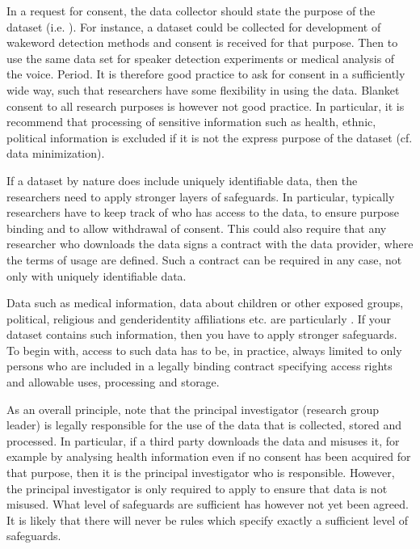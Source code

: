 \documentclass[letterpaper,10pt,english]{jupyterBook}
\begin{document}
\sphinxAtStartPar
In a request for consent, the data collector should state the purpose of
the dataset (i.e. ). For instance, a dataset could be
collected for development of wake\sphinxhyphen{}word detection methods and consent is
received for that purpose. Then  to use the same
data set for speaker detection experiments or medical analysis of the
voice. Period. It is therefore good practice to ask for consent in a
sufficiently wide way, such that researchers have some flexibility in
using the data. Blanket consent to all research purposes is however not
good practice. In particular, it is recommend that processing of
sensitive information such as health, ethnic, political information is
excluded if it is not the express purpose of the dataset (cf. data
minimization).

\sphinxAtStartPar
If a dataset by nature does include uniquely identifiable data, then the
researchers need to apply stronger layers of safeguards. In particular,
typically researchers have to keep track of who has access to the data,
to ensure purpose binding and to allow withdrawal of consent. This could
also require that any researcher who downloads the data signs a contract
with the data provider, where the terms of usage are defined. Such a
contract can be required in any case, not only with uniquely
identifiable data.

\sphinxAtStartPar
Data such as medical information, data about children or other exposed
groups, political, religious and gender\sphinxhyphen{}identity affiliations etc. are
particularly . If your dataset contains  such
information, then you have to apply stronger safeguards. To begin with,
access to such data has to be, in practice, always limited to only
persons who are included in a legally binding contract specifying access
rights and allowable uses, processing and storage.

\sphinxAtStartPar
As an overall principle, note that the principal investigator (research
group leader) is legally responsible for the use of the data that is
collected, stored and processed. In particular, if a third party
downloads the data and misuses it, for example by analysing health
information even if no consent has been acquired for that purpose, then
it is the principal investigator who is responsible. However, the
principal investigator is only required to apply 
 to ensure that data is not misused. What level of
safeguards are sufficient has however not yet been agreed. It is likely
that there will never be rules which specify exactly a sufficient level
of safeguards.
\end{document}
